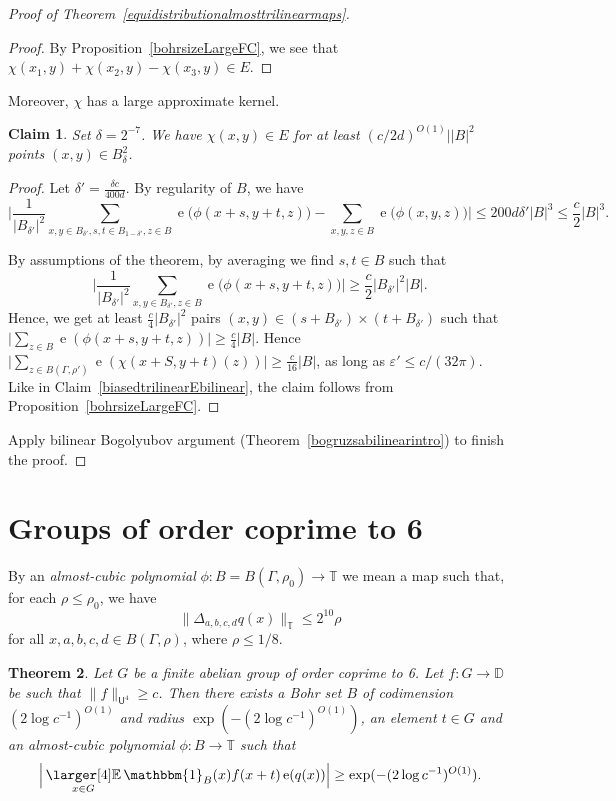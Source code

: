 \documentclass[a4paper,11pt]{article}
\newtheorem{theorem}{Theorem}
\numberwithin{theorem}{section}
\newtheorem{claim}[theorem]{Claim}
\theoremstyle{definition}
\newcommand\id{\mathbbm{1}}
\newcommand{\on}[1]{
	\operatorname{#1}
}
\newcommand{\exx}{
  \mathop{
    \mathchoice{\vcenter{\hbox{\larger[4]$\mathbb{E}$}}}
               {\kern0pt\mathbb{E}}
               {\kern0pt\mathbb{E}}
               {\kern0pt\mathbb{E}}
  }\displaylimits
}
\begin{document}
\begin{proof}[Proof of Theorem~\ref{equidistributionalmosttrilinearmaps}]
\begin{proof}
        By Proposition~\ref{bohrsizeLargeFC}, we see that $\chi(x_1,y) + \chi(x_2, y) - \chi(x_3, y) \in E$. 
    \end{proof}

    Moreover, $\chi$ has a large approximate kernel.

    \begin{claim}
        Set $\delta = 2^{-7}$. We have $\chi(x,y) \in E$ for at least $(c/2d)^{O(1)}| |B|^2$ points $(x,y) \in B_{\delta}^2$.
    \end{claim}

    \begin{proof}
        Let $\delta' = \frac{\delta c}{400d}$. By regularity of $B$, we have 
        \[\Big|\frac{1}{|B_{\delta'}|^2}\sum_{x, y \in B_{\delta'}, s, t \in B_{1-\delta'}, z \in B} \on{e}\Big(\phi(x + s, y + t, z)\Big) - \sum_{ x,y, z \in B} \on{e}\Big(\phi(x, y, z)\Big)\Big| \leq 200d \delta' |B|^3 \leq \frac{c}{2}|B|^3.\]

        By assumptions of the theorem, by averaging we find $s,t \in B$ such that 
        \[\Big|\frac{1}{|B_{\delta'}|^2}\sum_{x, y \in B_{\delta'}, z \in B} \on{e}\Big(\phi(x + s, y + t, z)\Big)\Big| \geq \frac{c}{2}|B_{\delta'}|^2|B|.\]
        Hence, we get at least $\frac{c}{4}|B_{\delta'}|^2$ pairs $(x,y) \in (s +B_{\delta'}) \times  (t +B_{\delta'})$ such that $\Big|\sum_{z \in B} \on{e}(\phi(x + s, y + t, z))\Big| \geq \frac{c}{4} |B|$. Hence $\Big|\sum_{z \in B(\Gamma, \rho')} \on{e}(\chi(x +S, y + t)(z))\Big| \geq \frac{c}{16} |B|$, as long as $\varepsilon' \leq c / (32\pi)$. Like in Claim~\ref{biasedtrilinearEbilinear}, the claim follows from Proposition~\ref{bohrsizeLargeFC}. 
    \end{proof}

    Apply bilinear Bogolyubov argument (Theorem~\ref{bogruzsabilinearintro}) to finish the proof.
\end{proof}

\section{Groups of order coprime to 6}\label{generalabelianinverseunifsection}

By an \emph{almost-cubic polynomial} $\phi : B = B(\Gamma, \rho_0) \to \mathbb{T}$ we mean a map such that, for each $\rho \leq \rho_0$, we have
\[\|\Delta_{a,b,c,d} q(x)\|_{\mathbb{T}} \leq  2^{10} \rho\]
for all $x, a,b,c,d \in B(\Gamma, \rho)$, where $\rho \leq 1/8$.

\begin{theorem}\label{generalU4}
    Let $G$ be a finite abelian group of order coprime to 6. Let $f : G \to \mathbb{D}$ be such that $\|f\|_{\mathsf{U}^4} \geq c$. Then there exists a Bohr set $B$ of codimension $(2 \log c^{-1})^{O(1)}$ and radius $\exp(-(2 \log c^{-1})^{O(1)})$, an element $t \in G$ and an almost-cubic polynomial $\phi : B  \to \mathbb{T}$ such that 
    \[\Big|\exx_{x \in G} \id_{B}(x) f(x + t) \on{e}(q(x))\Big| \geq \exp(-(2 \log c^{-1})^{O(1)}).\]
\end{theorem}
\end{document}
